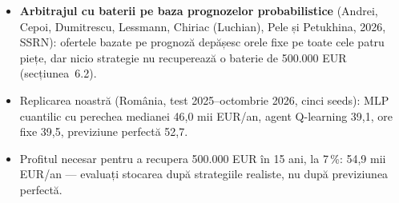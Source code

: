 \begin{itemize}\setlength{\itemsep}{2pt}
  \item \textbf{Arbitrajul cu baterii pe baza prognozelor probabilistice} (Andrei, Cepoi, Dumitrescu, Lessmann, Chiriac (Luchian), Pele și Petukhina, 2026, SSRN): ofertele bazate pe prognoză depășesc orele fixe pe toate cele patru piețe, dar nicio strategie nu recuperează o baterie de 500.000 EUR (secțiunea~6.2).
  \item Replicarea noastră (România, test 2025--octombrie 2026, cinci seeds): MLP cuantilic cu perechea medianei 46,0 mii EUR/an, agent Q-learning 39,1, ore fixe 39,5, previziune perfectă 52,7.
  \item Profitul necesar pentru a recupera 500.000 EUR în 15 ani, la 7\,\%: 54,9 mii EUR/an --- evaluați stocarea după strategiile realiste, nu după previziunea perfectă.
\end{itemize}
